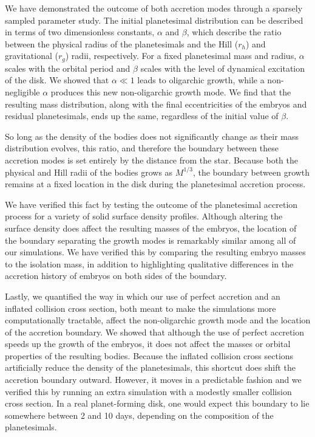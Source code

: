 \documentclass[twocolumn]{aastex63}
\begin{document}
We have demonstrated the outcome of both accretion modes through a
sparsely sampled parameter study. The initial planetesimal distribution can be described in terms of two dimensionless constants, $\alpha$ and $\beta$, which describe the ratio between the physical radius of the planetesimals and the Hill ($r_{h}$) and gravitational ($r_{g}$) radii, respectively. For a fixed planetesimal mass and radius, $\alpha$ scales with the orbital period and $\beta$ scales with the level of dynamical excitation of the disk. We showed that $\alpha \ll 1$ leads to oligarchic growth, while a non-negligible $\alpha$ produces this new non-oligarchic growth mode. We find that the resulting mass distribution, along with the final eccentricities of the embryos and residual planetesimals, ends up the same, regardless of the initial value of $\beta$.

So long as the density of the bodies does not significantly change as
their mass distribution evolves, this ratio, and therefore the
boundary between these accretion modes is set entirely by the distance
from the star. Because both the physical and Hill radii of the bodies
grows as $M^{1/3}$, the boundary between growth remains at a fixed
location in the disk during the planetesimal accretion process.

We have verified this fact by testing the outcome of the planetesimal
accretion process for a variety of solid surface density
profiles. Although altering the surface density does affect the
resulting masses of the embryos, the location of the boundary
separating the growth modes is remarkably similar among all of our simulations. We have verified this by comparing the resulting embryo masses to the isolation mass, in addition to highlighting qualitative differences in the accretion history of embryos on both sides of the boundary.

Lastly, we quantified the way in which our use of perfect accretion and an inflated collision cross section, both meant to make the simulations more computationally tractable, affect the non-oligarchic growth mode and the location of the accretion boundary. We showed that although the use of perfect accretion speeds up the growth of the embryos, it does not affect the masses or orbital properties of the resulting bodies. Because the inflated collision cross sections artificially reduce the density of the planetesimals, this shortcut does shift the accretion boundary outward. However, it moves in a predictable fashion and we verified this by running an extra simulation with a modestly smaller collision cross section. In a real planet-forming disk, one would expect this boundary to lie somewhere between 2 and 10 days, depending on the composition of the planetesimals.
\end{document}

